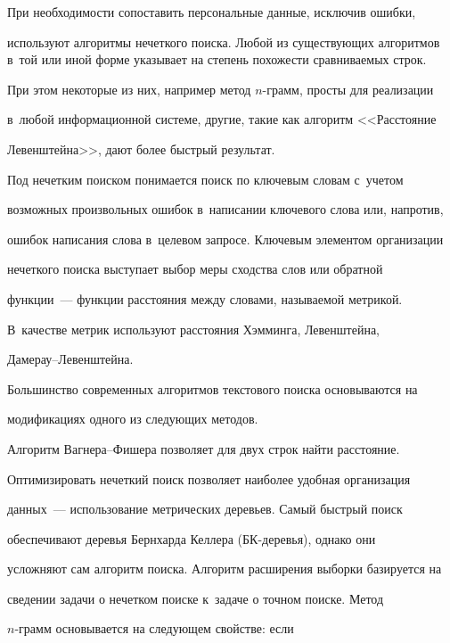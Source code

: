  


  При необходимости сопоставить персональные данные, исключив ошибки, 


используют алгоритмы нечеткого поиска. Любой из существующих алгоритмов в~той или иной форме указывает на степень похожести сравниваемых строк. 


При этом некоторые из них, например метод $n$-грамм, просты для реализации 


в~любой информационной системе, другие, такие как алгоритм <<Расстояние 


Левенштейна>>, дают более быстрый результат. 


  


  Под нечетким поиском понимается поиск по ключевым словам с~учетом 


возможных произвольных ошибок в~написании ключевого слова или, напротив, 


ошибок написания слова в~целевом запросе. Ключевым элементом организации 


нечеткого поиска выступает выбор меры сходства слов или обратной 


функции~--- функции расстояния между словами, называемой метрикой. 


В~качестве метрик используют расстояния Хэмминга, Левенштейна,  


Да\-ме\-рау--Ле\-вен\-штейна. 


  


  Большинство современных алгоритмов текстового поиска основываются на 


модификациях одного из следующих методов. 


  


  Алгоритм Вагнера--Фишера позволяет для двух строк найти расстояние. 


Оптимизировать нечеткий поиск позволяет наиболее удобная организация 


данных~--- использование метрических деревьев. Самый быстрый поиск 


обеспечивают деревья Бернхарда Келлера (БК-де\-ревья), однако они 


усложняют сам алгоритм поиска. Алгоритм расширения выборки базируется на 


сведении задачи о нечетком поиске к~задаче о точном поиске. Метод 


  \mbox{$n$-грамм} основывается на следующем свойстве: если 


